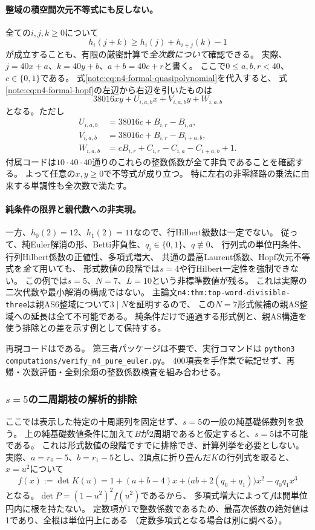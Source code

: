 \documentclass[11pt,a4paper]{ltjsarticle}
\begin{document}
\paragraph{整域の積空間次元不等式にも反しない。}
全ての$i,j,k\ge0$について
\begin{equation}\label{note:eq:n4-formal-hopf}
h_i(j+k)\ge h_i(j)+h_{i+j}(k)-1
\end{equation}
が成立することも、有限の厳密計算で\emph{全次数について}確認できる。
実際、$j=40x+a$、$k=40y+b$、$a+b=40c+r$と書く。
ここで$0\le a,b,r<40$、$c\in\{0,1\}$である。
式\eqref{note:eq:n4-formal-quasipolynomial}を代入すると、
式\eqref{note:eq:n4-formal-hopf}の左辺から右辺を引いたものは
\[
38016xy+U_{i,a,b}x+V_{i,a,b}y+W_{i,a,b}
\]
となる。ただし
\begin{align*}
U_{i,a,b}&=38016c+B_{i,r}-B_{i,a},\\
V_{i,a,b}&=38016c+B_{i,r}-B_{i+a,b},\\
W_{i,a,b}&=cB_{i,r}+C_{i,r}-C_{i,a}-C_{i+a,b}+1.
\end{align*}
付属コードは$10\cdot40\cdot40$通りのこれらの整数係数が全て非負であることを確認する。
よって任意の$x,y\ge0$で不等式が成り立つ。
特に左右の非零経路の乗法に由来する単調性も全次数で満たす。

\paragraph{純条件の限界と親代数への非実現。}
一方、$h_0(2)=12$、$h_1(2)=11$なので、行Hilbert級数は一定でない。
従って、純Euler解消の形、Betti非負性、$q_i\in\{0,1\}$、$q\not\equiv0$、
行列式の単位円条件、行列Hilbert係数の正値性、多項式増大、
共通の最高Laurent係数、Hopf次元不等式を\emph{全て}用いても、
形式数値の段階では$s=4$や行Hilbert一定性を強制できない。
この例では$s=5$、$N=7$、$L=10$という非標準数値が残る。
これは実際の二次代数や最小解消の構成ではない。
主論文\texttt{n4:thm:top-word-divisible-three}は親AS6整域について$3\mid N$を証明するので、
この$N=7$形式候補の親AS整域への延長は全て不可能である。
純条件だけで通過する形式例と、親AS構造を使う排除との差を示す例として保持する。

再現コードはである。
第三者パッケージは不要で、実行コマンドは
\texttt{python3 computations/verify\_n4\_pure\_euler.py}。
400項表を手作業で転記せず、再帰・次数評価・全剰余類の整数係数検査を組み合わせる。

\subsubsection{\texorpdfstring{$s=5$}{s=5}の二周期枝の解析的排除}
\label{note:n4-s5-period-two-obstruction}
ここでは表示した特定の十周期列を固定せず、$s=5$の一般の純基礎係数列を扱う。
上の純基礎数値条件に加えて$B$が2周期であると仮定すると、$s=5$は不可能である。
これは形式数値の段階ですでに排除でき、計算列挙を必要としない。
実際、$a=r_0-5$、$b=r_1-5$とし、2頂点に折り畳んだ$K$の行列式を取ると、
$x=u^2$について
\[
f(x):=\det K(u)
=1+(a+b-4)x+\bigl(ab+2(q_0+q_1)\bigr)x^2-q_0q_1x^3
\]
となる。$\det P=(1-u^2)^2f(u^2)$であるから、
多項式増大によって$f$は開単位円内に根を持たない。
定数項が1で整数係数であるため、最高次係数の絶対値は1であり、全根は単位円上にある
（定数多項式となる場合は別に調べる）。
\end{document}
